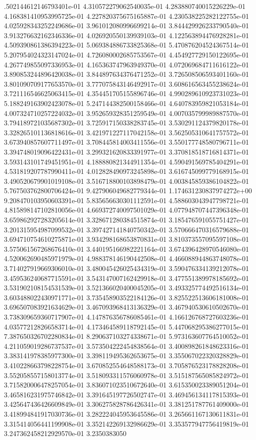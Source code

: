 .502144612146793401e-01	4.310572279062540035e-01	4.283880740015226229e-01	4.168381410953995725e-01	4.227820375675165887e-01	4.230538225282122755e-01	4.025928343252249686e-01	3.961012080996699214e-01	3.844429926233790540e-01	3.913276632162346336e-01	4.026920550139939103e-01	4.122563894476928281e-01	4.509390861386394223e-01	5.069384886733825368e-01	5.470876204524367514e-01	5.207954024323147024e-01	4.726080002685753567e-01	4.454927729150122695e-01	4.267749855097336953e-01	4.165363747963949370e-01	4.072069684711616122e-01	3.890853244896420038e-01	3.844897634376471252e-01	3.726508506593401160e-01	3.801090709177653570e-01	3.777075843146492917e-01	3.608616563455238624e-01	3.721116546625063415e-01	4.354451705155896746e-01	4.990289610923731023e-01	5.188249163902423078e-01	5.247144382500158466e-01	4.640783959821053184e-01	4.007324710257224032e-01	3.952659328351259549e-01	4.007035799989887570e-01	3.794189721035687302e-01	3.725917150338283745e-01	3.530291124379820178e-01	3.328265101136818616e-01	3.421971227117042158e-01	3.562505310641757572e-01	3.673940857607711497e-01	3.708445814003411556e-01	3.550177748580796711e-01	3.394748019096422431e-01	3.299321620833391977e-01	3.370818518716814371e-01	3.593143101749451951e-01	4.188880821344911354e-01	4.590491569785404291e-01	4.531819207787990411e-01	4.012828490973245898e-01	3.616745099779168915e-01	3.490520679901019108e-01	3.516718800103898479e-01	4.003845859386104822e-01	5.767503762800706424e-01	9.427906049682779344e-01	1.174631230837974272e+00	9.208470103950603391e-01	5.835656630301112591e-01	4.588603043947798721e-01	4.815898147102810056e-01	4.669372740097501029e-01	4.077948707447396348e-01	3.659862927283205614e-01	3.328671280384515874e-01	3.185476591055751427e-01	3.201315954987099532e-01	3.397427141840750342e-01	3.570666470316579688e-01	3.694710754610275871e-01	3.934298168653870831e-01	3.810373557095597108e-01	3.575061567268676410e-01	3.440195166982221164e-01	3.674396428970546080e-01	4.520062690485971979e-01	4.988378146190442508e-01	4.466088944863748078e-01	3.714027919669306010e-01	3.480045426025434319e-01	3.590476334139212078e-01	3.459536240687715591e-01	3.543147007162429918e-01	3.477551389978185692e-01	3.531902108154531539e-01	3.521366020400045205e-01	3.493325774492516134e-01	3.603488022430971771e-01	3.735458903522184126e-01	3.825522513606181008e-01	3.696507083921634629e-01	3.467093968413136329e-01	3.467940530610502670e-01	3.738309659360717907e-01	4.147876356786085461e-01	4.166126768727603236e-01	4.035772128266583714e-01	4.173464589118792145e-01	5.447068295386277015e-01	7.387650326702280834e-01	8.290637103274338671e-01	5.973163607764510052e-01	4.211059019286737537e-01	3.573504222454838564e-01	3.400898261848623316e-01	3.383141978385977300e-01	3.398119495362653675e-01	3.355067022320328829e-01	3.410228663798228754e-01	3.670852554648588173e-01	3.705876523178828208e-01	3.552058557158013774e-01	3.518093311576060978e-01	3.515187565085824972e-01	3.715820006478257054e-01	3.836071023510672640e-01	3.615350023389051204e-01	3.465816231975746842e-01	3.391645197726502747e-01	3.469456134117815393e-01	3.425647436426609849e-01	3.306275828786426341e-01	3.381251787761409000e-01	3.418994841917030736e-01	3.282224045953645586e-01	3.265661167130611831e-01	3.315414056441199908e-01	3.352142269132986629e-01	3.353577947756419819e-01	3.247362458212929570e-01	3.2350383050